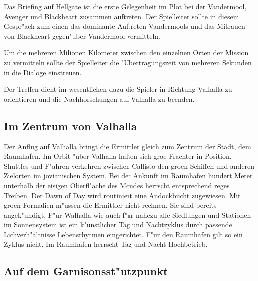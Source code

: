\begin{remarks}
	Das Briefing auf Hellgate ist die erste Gelegenheit im Plot bei der Vandermool, Avenger und Blackheart zusammen auftreten. Der Spielleiter sollte in diesem Gespr"ach zum einen das dominante Auftreten Vandermools und das Mi\3trauen von Blackheart gegen"uber Vandermool vermitteln.

	Um die mehreren Milionen Kilometer zwischen den einzelnen Orten der Mission zu vermitteln sollte der Spielleiter die "Ubertragungszeit von mehreren Sekunden in die Dialoge einstreuen.

	Der Treffen dient im wesentlichen dazu die Spieler in Richtung Valhalla zu orientieren und die Nachhorschungen auf Valhalla zu beenden.
\end{remarks}

\subsection{Im Zentrum von Valhalla}

Der Anflug auf Valhalla bringt die Ermittler gleich zum Zentrum der Stadt, dem Raumhafen. Im Orbit "uber Valhalla halten sich gro\3e Frachter in Position. Shuttles und F"ahren verkehren zwischen Callisto den gro\3en Schiffen und anderen Zielorten im jovianischen System. Bei der Ankunft im Raumhafen hundert Meter unterhalb der eisigen Oberfl"ache des Mondes herrscht entsprechend reges Treiben. Der Dawn of Day wird routiniert eine Andockbucht zugewiesen. Mit gro\3en Formalien m"ussen die Ermittler nicht rechnen. Sie sind bereits angek"undigt. F"ur Walhalla wie auch f"ur nahezu alle Siedlungen und Stationen im Sonnensystem ist ein k"unstlicher Tag und Nachtzyklus durch passende Lichverh"altnisse Lebensrhytmen eingerichtet. F"ur den Raumhafen gilt so ein Zyklus nicht. Im Raumhafen herrscht Tag und Nacht Hochbetrieb. 

\subsection{Auf dem Garnisonsst"utzpunkt}


